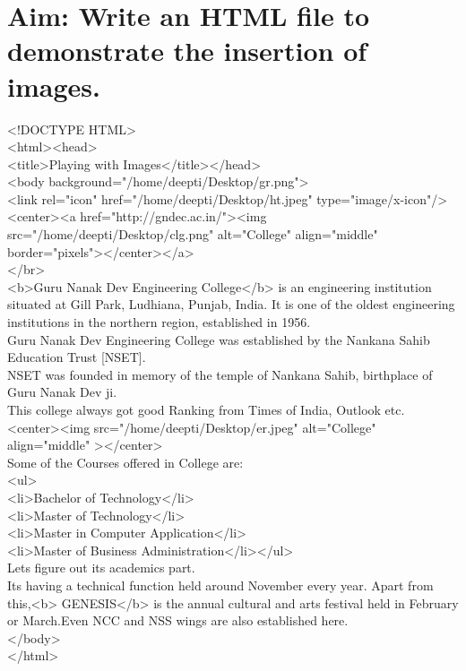 \section*{\fontsize{16}{14}\selectfont Aim: Write an HTML file to demonstrate the insertion of images.}
<!DOCTYPE HTML>\\
<html><head>\\
<title>Playing with Images</title></head>\\
<body background="/home/deepti/Desktop/gr.png">\\
<link rel="icon" href="/home/deepti/Desktop/ht.jpeg" type="image/x-icon"/>\\
<center><a href="http://gndec.ac.in/"><img src="/home/deepti/Desktop/clg.png" alt="College" align="middle" border="pixels"></center></a>\\
</br>\\
<b>Guru Nanak Dev Engineering College</b> is an engineering institution situated at Gill Park, Ludhiana, Punjab, India. It is one of the oldest engineering institutions in the northern region, established in 1956. \\
Guru Nanak Dev Engineering College was established by the Nankana Sahib Education Trust [NSET].\\
NSET was founded in memory of the temple of Nankana Sahib, birthplace of Guru Nanak Dev ji.\\
This college always got good Ranking from Times of India, Outlook etc.\\
<center><img src="/home/deepti/Desktop/er.jpeg" alt="College" align="middle" ></center>\\
Some of the Courses offered in College are:\\
<ul>\\
<li>Bachelor of Technology</li>\\
<li>Master of Technology</li>\\
<li>Master in Computer Application</li>\\
<li>Master of Business Administration</li></ul>\\
Lets figure out its academics part.\\
Its having a technical function held around November every year. Apart from this,<b> GENESIS</b> is the annual cultural and arts festival held in February or March.Even NCC and NSS wings are also established here.\\
</body>\\
</html> 
